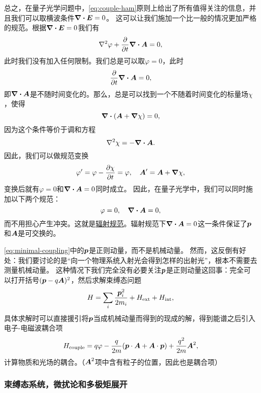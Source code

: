 \documentclass[UTF8, a4paper]{ctexart}
\newcommand{\concept}[1]{\underline{#1}}
\begin{document}
总之，在量子光学问题中，\eqref{eq:couple-ham}原则上给出了所有值得关注的信息，并且我们可以取横波条件$\div{\vb*{E}}=0$。
这可以让我们施加一个比一般的情况更加严格的规范。根据$\div{\vb*{E}}=0$我们有
\[
    \laplacian{\varphi} + \pdv{t} \div{\vb*{A}} = 0,
\]
此时我们没有加入任何限制。我们总是可以取$\varphi=0$，此时
\[
    \pdv{t} \div{\vb*{A}} = 0,
\]
即$\div{\vb*{A}}$是不随时间变化的。那么，总是可以找到一个不随着时间变化的标量场$\chi$，使得
\[
    \div{(\vb*{A} + \grad{\chi})} = 0,
\]
因为这个条件等价于调和方程
\[
    \laplacian{\chi} = - \div{\vb*{A}}.
\]
因此，我们可以做规范变换
\[
    \varphi' = \varphi - \pdv{\chi}{t} = \varphi, \quad \vb*{A}' = \vb*{A} + \grad{\chi},
\]
变换后就有$\varphi=0$和$\div{\vb*{A}}=0$同时成立。
因此，在量子光学中，我们可以同时施加以下两个规范：
\begin{equation}
    \varphi = 0, \quad \div{\vb*{A}} = 0,
\end{equation}
而不用担心产生冲突。这就是\concept{辐射规范}。辐射规范下$\div{\vb*{A}}=0$这一条件保证了$\vb*{p}$和$\vb*{A}$是可交换的。

\eqref{eq:minimal-coupling}中的$\vb*{p}$是正则动量，而不是机械动量。
然而，这反倒有好处：我们要讨论的是“向一个物理系统入射光会得到怎样的出射光”，根本不需要去测量机械动量。
这种情况下我们完全没有必要关注$\vb*{p}$是正则动量这回事：完全可以打开括号$(\vb*{p} - q \vb*{A})^2$，然后求解束缚态问题
\begin{equation}
    H = \sum_i \frac{\vb*{p}_i^2}{2m_i} + H_\text{ext} + H_\text{int},
    \label{eq:levels-ham}
\end{equation}
具体求解时可以直接援引将$\vb*{p}$当成机械动量而得到的现成的解，得到能谱之后引入电子-电磁波耦合项
\begin{equation}
    H_\text{couple} = q \varphi - \frac{q}{2m} (\vb*{p} \cdot \vb*{A} + \vb*{A} \cdot \vb*{p}) + \frac{q^2}{2m} \vb*{A}^2,
    \label{eq:couple-ham}
\end{equation}
计算物质和光场的耦合。（$\vb*{A}^2$项中含有粒子的位置，因此也是耦合项）

\subsubsection{束缚态系统，微扰论和多极矩展开}
\end{document}
